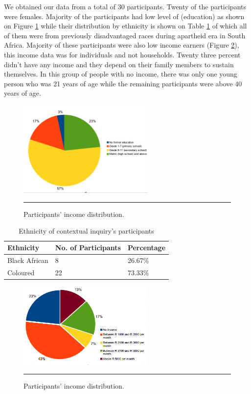 We obtained our data from a total of 30 participants. Twenty of the participants were females. Majority of the participants had low level  of (education) as shown on Figure \ref{figure:education_level} while their distribution by ethnicity is shown on Table \ref{table:ethnicity} of which all of them were from previously disadvantaged races during apartheid era in South Africa. Majority of these participants were also low income earners (Figure \ref{figure:income_distr}), this income data was for individuals and not households. Twenty three percent didn't have any income and they depend on their family members to sustain themselves. In this group of people with no income, there was only one young person who was 21 years of age while the remaining participants were above 40 years of age.
\begin{figure}[htbp]
  \centering
    \includegraphics[width=0.6\textwidth]{Figures/education_level.png}
    \rule{35em}{0.5pt}
  \caption{Participants' income distribution.}
  \label{figure:education_level}
\end{figure}

\begin{table}[h!]
  \begin{center}
    \caption{Ethnicity of contextual inquiry's participants}
    \label{table:ethnicity}
	\begin{tabular}{|p{3cm}|p{4cm}|p{2cm}|}
		\hline
		\textbf{Ethnicity}&\textbf{No. of Participants}&\textbf{Percentage}\\
		\hline
		 Black African&8 &26.67\% \\
		\hline
		 Coloured&22& 73.33\%\\
	\hline
	\end{tabular}
  \end{center}
\end{table}

\begin{figure}[htbp]
  \centering
    \includegraphics[width=0.6\textwidth]{Figures/income_distr.png}
    \rule{35em}{0.5pt}
  \caption{Participants' income distribution.}
  \label{figure:income_distr}
\end{figure}

